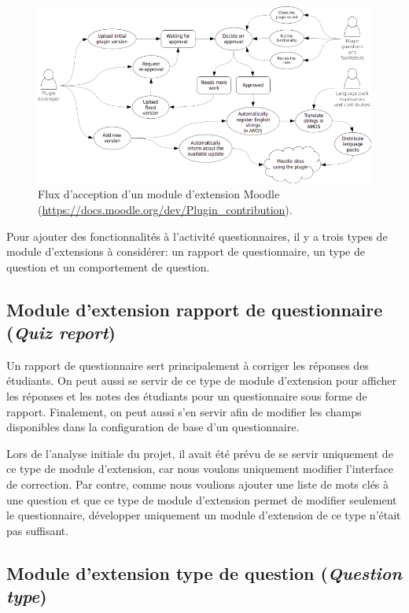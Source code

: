 \begin{figure}[h!]
  \includegraphics[scale=0.7]{images/plugin-contribution-workflow.png}
  \caption[Flux d'acception d'un module d'extension Moodle]{Flux d'acception d'un module d'extension Moodle (\href{https://docs.moodle.org/dev/Plugin_contribution}{\url{https://docs.moodle.org/dev/Plugin\_contribution}}).}
  \label{plugin-workflow}
\end{figure}

Pour ajouter des fonctionnalités à l'activité questionnaires, il y a trois types de module d'extensions à considérer: un rapport de questionnaire, un type de question et un comportement de question.

\subsection{Module d'extension rapport de questionnaire (\textit{Quiz report})}

Un rapport de questionnaire sert principalement à corriger les réponses des étudiants.
On peut aussi se servir de ce type de module d'extension pour afficher les réponses et les notes des étudiants pour un questionnaire sous forme de rapport.
Finalement, on peut aussi s'en servir afin de modifier les champs disponibles dans la configuration de base d'un questionnaire.

Lors de l'analyse initiale du projet, il avait \'et\'e prévu de se servir uniquement de ce type de module d'extension, car nous voulons uniquement modifier l'interface de correction.
Par contre, comme nous voulions ajouter une liste de mots clés à une question et que ce type de module d'extension permet de modifier seulement le questionnaire, d\'evelopper uniquement un module d'extension de ce type n'\'etait pas suffisant.

\subsection{Module d'extension type de question (\textit{Question type})}


